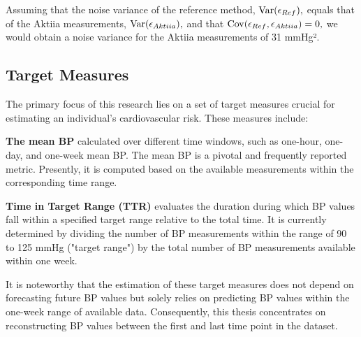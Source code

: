 Assuming that the noise variance of the reference method, $\operatorname{Var}(\epsilon_{Ref}),$
equals that of the Aktiia measurements, $\operatorname{Var}(\epsilon_{Aktiia}),$ and that
$\operatorname{Cov}(\epsilon_{Ref}, \epsilon_{Aktiia})=0,$ we would obtain a noise variance for the Aktiia
measurements of 31 mmHg².

\subsection{Target Measures}\label{subsec:target-measures}

The primary focus of this research lies on a set of target measures crucial for
estimating an individual's cardiovascular risk. These measures include:

\textbf{The mean BP} calculated over different time windows, such as one-hour,
one-day, and one-week mean BP. The mean BP is a pivotal and frequently reported
metric. Presently, it is computed based on the available measurements within the
corresponding time range.

\textbf{Time in Target Range (TTR)} evaluates the duration during which BP values
fall within a specified target range relative to the total time. It is currently
determined by dividing the number of BP measurements within the range of 90 to
125 mmHg ("target range") by the total number of BP measurements available
within one week.

It is noteworthy that the estimation of these target measures does not depend on
forecasting future BP values but solely relies on predicting BP values within the
one-week range of available data. Consequently, this thesis concentrates on
reconstructing BP values between the first and last time point in the dataset.



%
%
%
%
%





